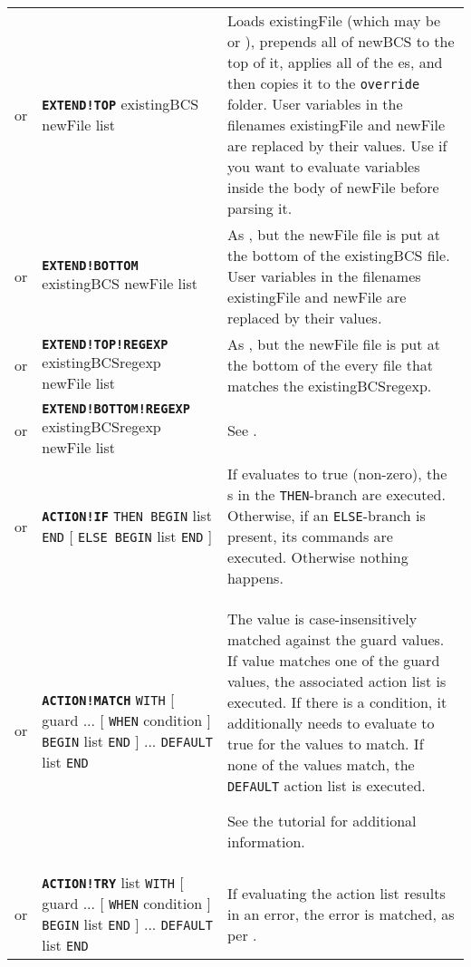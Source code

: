 \documentclass{article}
\def\ttref#1{\ahrefloc{#1}{\tt #1}}
\def\DEFINE#1{{\tt \bf #1}\label{#1}\index{#1}}
\def\DEFSYN#1{{\tt \bf #1}\index{#1}}
\def\t#1{{\tt #1}}
\def\Slist{{\color{red} list }}
\def\Ob{{\color{red} [ }}
\def\Oe{{\color{red} ] }}
\begin{document}
\begin{tabular}{cp{10in}|p{10in}}
  or & \DEFSYN{EXTEND!TOP} existingBCS newFile \ttref{patch} \Slist &
    Loads existingFile (which may be \ttref{BAF} or \ttref{BCS}), prepends
    all of newBCS to the top of it, applies all of the \ttref{patch}es, and
    then copies it to the \t{override} folder. User variables in
    the filenames existingFile and newFile are replaced by their values.
    Use \ttref{EVALUATE!BUFFER} if you want to evaluate variables inside
    the body of newFile before parsing it. \\
  or & \DEFSYN{EXTEND!BOTTOM} existingBCS newFile \ttref{patch} \Slist &
    As \ttref{EXTEND!TOP}, but the newFile file is put at the bottom of the
    existingBCS file. User variables in the filenames existingFile and
    newFile are replaced by their values. \\
  or & \DEFINE{EXTEND!TOP!REGEXP} existingBCSregexp newFile \ttref{patch} \Slist &
    As \ttref{EXTEND!TOP}, but the newFile file is put at the bottom of the
    every \ttref{BCS} file that matches the \ttref{regexp}
    existingBCSregexp. \\
  or & \DEFINE{EXTEND!BOTTOM!REGEXP} existingBCSregexp newFile \ttref{patch} \Slist &
    See \ttref{EXTEND!TOP!REGEXP}.  \\
  or & \DEFINE{ACTION!IF} \ttref{value} \t{THEN BEGIN}
    \ttref{TP2 Action} \Slist \t{END}
    \Ob \t{ELSE BEGIN} \ttref{TP2 Action} \Slist \t{END} \Oe &
    If \ttref{value} evaluates to true (non-zero), the \ttref{TP2 Action}s
    in the \t{THEN}-branch are executed. Otherwise, if an \t{ELSE}-branch
    is present, its commands are executed. Otherwise nothing happens. \\
  or & \DEFINE{ACTION!MATCH} \ttref{value} \t{WITH} \Ob guard\ttref{value} ...
    \Ob \t{WHEN} condition\ttref{value} \Oe
    \t{BEGIN} \ttref{TP2 Action} \Slist \t{END} \Oe ...
    \t{DEFAULT} \ttref{TP2 Action} \Slist \t{END} &
    The value is case-insensitively matched against the guard
    values. If value matches one of the guard values, the associated
    action list is executed. If there is a condition, it additionally
    needs to evaluate to true for the values to match. If none
    of the values match, the \t{DEFAULT} action list is executed.

    See the \ttref{MATCH and TRY} tutorial for additional information.
  \\
  or & \DEFINE{ACTION!TRY} \ttref{TP2 Action} \Slist \t{WITH} \Ob guard\ttref{value} ...
    \Ob \t{WHEN} condition\ttref{value} \Oe
    \t{BEGIN} \ttref{TP2 Action} \Slist \t{END} \Oe ...
    \t{DEFAULT} \ttref{TP2 Action} \Slist \t{END} &
    If evaluating the action list results in an error, the error is matched, as per \ttref{ACTION!MATCH}.


\end{tabular}
\end{document}
